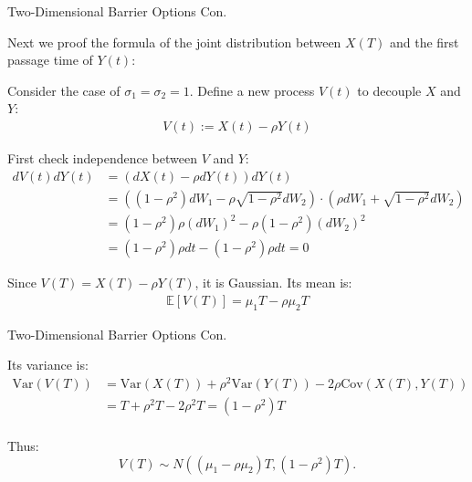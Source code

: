 \documentclass{beamer}
\begin{document}
\begin{frame}{Two-Dimensional Barrier Options Con.}

    {\footnotesize \footnotesize
    Next we proof the formula of the joint distribution between \( X(T) \) 
    and the first passage time of \( Y(t) \):
    \par [Proof]
    \par Consider the case of $\sigma_1 = \sigma_2 = 1$. Define a new process $V(t)$ to decouple $X$ and $Y$:
    \begin{align*}
        V(t) := X(t) - \rho Y(t)
    \end{align*}
    \par First check independence between $V$ and $Y$:
    \begin{align*}
        dV(t)  dY(t)  & = (dX(t) - \rho  dY(t))  dY(t)\\
        &= \left( (1 - \rho^2) dW_1 - \rho \sqrt{1 - \rho^2}  
        dW_2 \right) \cdot \left( \rho dW_1 + \sqrt{1 - \rho^2}  dW_2 \right)\\
        &=(1 - \rho^2) \rho (dW_1)^2 - \rho (1 - \rho^2) (dW_2)^2\\
        &= (1 - \rho^2) \rho dt - (1 - \rho^2) \rho dt = 0
    \end{align*}
    \par  Since \( V(T) = X(T) - \rho Y(T) \), it is Gaussian. Its mean is:
    \begin{align*}
        \mathbb{E}[V(T)] = \mu_1 T - \rho \mu_2 T
    \end{align*}
    }
\end{frame}
\begin{frame}{Two-Dimensional Barrier Options Con.}

    {\footnotesize \footnotesize
    \par Its variance is:
    \begin{align*}
        \text{Var}(V(T)) 
        &= \text{Var}(X(T)) + \rho^2 \text{Var}(Y(T)) - 2\rho \text{Cov}(X(T), Y(T))\\
        &= T + \rho^2 T - 2\rho^2 T = (1 - \rho^2)T\\
    \end{align*}
    \par Thus:
        \[
        V(T) \sim N((\mu_1 - \rho \mu_2)T, (1 - \rho^2)T).
        \]
    }
    
\end{frame}
\end{document}
